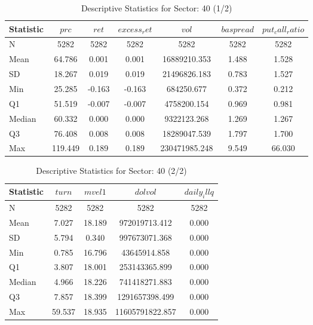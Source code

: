     \begin{table}[H]
    \centering

    
    \caption{Descriptive Statistics for Sector: 40 (1/2)}
    \label{tab:sec40_a}
    
    \begin{tabular}{lcccccc}
    \toprule
    Statistic & $prc$ & $ret$ & $excess_ret$ & $vol$ & $baspread$ & $put_call_ratio$ \\\midrule
    N & 5282 & 5282 & 5282 & 5282 & 5282 & 5282 \\
    Mean & 64.786 & 0.001 & 0.001 & 16889210.353 & 1.488 & 1.528 \\
    SD & 18.267 & 0.019 & 0.019 & 21496826.183 & 0.783 & 1.527 \\
    Min & 25.285 & -0.163 & -0.163 & 684250.677 & 0.372 & 0.212 \\
    Q1 & 51.519 & -0.007 & -0.007 & 4758200.154 & 0.969 & 0.981 \\
    Median & 60.332 & 0.000 & 0.000 & 9322123.268 & 1.269 & 1.267 \\
    Q3 & 76.408 & 0.008 & 0.008 & 18289047.539 & 1.797 & 1.700 \\
    Max & 119.449 & 0.189 & 0.189 & 230471985.248 & 9.549 & 66.030 \\
    \bottomrule
    \end{tabular}

    \end{table}
    
    \begin{table}[H]
    \centering

    
    \caption{Descriptive Statistics for Sector: 40 (2/2)}
    \label{tab:sec40_b}
    
    \begin{tabular}{lcccc}
    \toprule
    Statistic & $turn$ & $mvel1$ & $dolvol$ & $daily_illq$ \\\midrule
    N & 5282 & 5282 & 5282 & 5282 \\
    Mean & 7.027 & 18.189 & 972019713.412 & 0.000 \\
    SD & 5.794 & 0.340 & 997673071.368 & 0.000 \\
    Min & 0.785 & 16.796 & 43645914.858 & 0.000 \\
    Q1 & 3.807 & 18.001 & 253143365.899 & 0.000 \\
    Median & 4.966 & 18.226 & 741418271.883 & 0.000 \\
    Q3 & 7.857 & 18.399 & 1291657398.499 & 0.000 \\
    Max & 59.537 & 18.935 & 11605791822.857 & 0.000 \\
    \bottomrule
    \end{tabular}

    \end{table}
    
